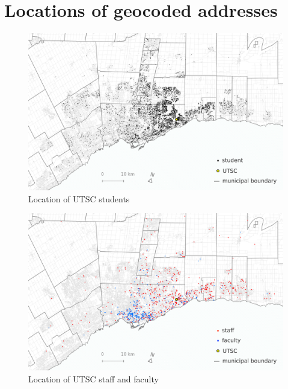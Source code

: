 \documentclass{article}
\begin{document}
	
	
	

\newpage
\appendix

\section{Locations of geocoded addresses}

	\begin{figure}[H]
		\vspace{2mm}
		\caption{Location of UTSC students}
		\vspace{2mm}
		\label{pt_students}
		\centerline{\includegraphics[width=5.5in]{figures/point_students.png}}
		\vspace{2mm}
	\end{figure}
	
	\begin{figure}[H]
		\vspace{2mm}
		\caption{Location of UTSC staff and faculty}
		\vspace{2mm}
		\label{pt_stafffaculty}
		\centerline{\includegraphics[width=5.5in]{figures/point_stafffaculty.png}}
		\vspace{2mm}
	\end{figure}
\end{document}
